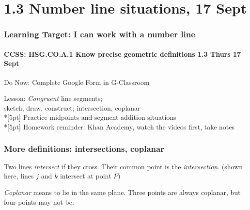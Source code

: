 \documentclass{beamer}
\begin{document}
  \section{1.3 Number line situations, 17 Sept}
  \frame
  {
    \frametitle{Learning Target: I can work with a number line}
    \framesubtitle{CCSS: HSG.CO.A.1 Know precise geometric definitions  \hfill \alert{1.3 Thurs 17 Sept}}
  
    \begin{block}{Do Now: Complete Google Form in G-Classroom}
    \end{block}
    Lesson: \emph{Congruent} line segments; 
    \\ sketch, draw, construct; intersection, coplanar \\*[5pt]
    Practice midpoints and segment addition situations \\*[5pt]
    Homework reminder: Khan Academy, watch the videos first, take notes
  }

  \frame
  {
    \frametitle{More definitions: intersections, coplanar}
    Two lines \emph{intersect} if they cross. Their common point is the \emph{intersection}. 
    (shown here, lines $j$ and $k$ intersect at point $P$)
    \begin{center}
      \end{center}
      \emph{Coplanar} means to lie in the same plane. Three points are always coplanar, but four points may not be. \\[0.15in]
      \begin{center}
    \end{center}
  }
\end{document}
